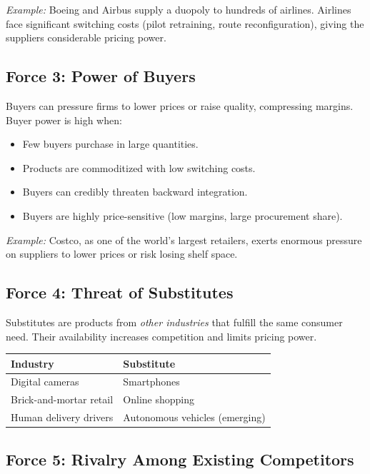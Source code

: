 \documentclass[11pt, letterpaper]{article}
\begin{document}
\textit{Example:} Boeing and Airbus supply a duopoly to hundreds of airlines. Airlines face significant switching costs (pilot retraining, route reconfiguration), giving the suppliers considerable pricing power.

\subsection{Force 3: Power of Buyers}

Buyers can pressure firms to lower prices or raise quality, compressing margins. Buyer power is high when:

\begin{itemize}[leftmargin=*, label=--]
  \item Few buyers purchase in large quantities.
  \item Products are commoditized with low switching costs.
  \item Buyers can credibly threaten backward integration.
  \item Buyers are highly price-sensitive (low margins, large procurement share).
\end{itemize}

\textit{Example:} Costco, as one of the world's largest retailers, exerts enormous pressure on suppliers to lower prices or risk losing shelf space.

\subsection{Force 4: Threat of Substitutes}

Substitutes are products from \textit{other industries} that fulfill the same consumer need. Their availability increases competition and limits pricing power.

\begin{center}
\begin{tabular}{ll}
\toprule
\textbf{Industry} & \textbf{Substitute} \\
\midrule
Digital cameras & Smartphones \\
Brick-and-mortar retail & Online shopping \\
Human delivery drivers & Autonomous vehicles (emerging) \\
\bottomrule
\end{tabular}
\end{center}

\subsection{Force 5: Rivalry Among Existing Competitors}
\end{document}
